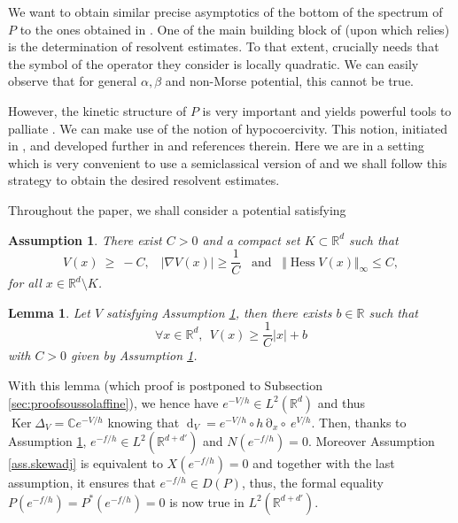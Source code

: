 \documentclass[12pt]{amsart}
\newcommand{\C}{\mathbb C}
\newcommand{\R}{\mathbb R}
\newcommand{\Hess}{\operatorname{Hess}}
\newcommand{\Ker}{\operatorname{Ker}}
\renewcommand{\d}{\operatorname{d}}
\numberwithin{equation}{section}
\numberwithin{figure}{section}
\DeclareMathOperator{\p}{\partial}
\newtheorem{lemma}[defin]{Lemma}
\newtheorem{assumption}{Assumption}
\begin{document}
We want to obtain similar precise asymptotics of the bottom of the spectrum of $P$ to the ones obtained in \cite{HeHiSj11_01,BoLePMi22}. One of the main building block of \cite{HeHiSj08-2} (upon which \cite{HeHiSj11_01,BoLePMi22} relies) is the determination of resolvent estimates. To that extent, \cite{HeHiSj08-2} crucially needs that the symbol of the operator they consider is locally quadratic. We can easily observe that for general $\alpha,\beta$ and non-Morse potential, this cannot be true.

However, the kinetic structure of $P$ is very important and yields powerful tools to palliate \cite{HeHiSj08-2}. We can make use of the notion of hypocoercivity. This notion, initiated in \cite{He06}, and developed further in \cite{Vi09,CaDoHeMiMoSc24} and references therein. Here we are in a setting which is very convenient to use a semiclassical version of \cite{DoMoSc15} and we shall follow this strategy to obtain the desired resolvent estimates.

Throughout the paper, we shall consider a potential satisfying

\begin{assumption}\label{ass.confin}
There exist $C>0$ and a compact  set $K\subset\R^d$ such that
\begin{equation*}
V(x)\ \geq\  -C,\;\;\;
 \vert\nabla V(x)\vert \geq \frac 1 C\;\;\;\text{and}\;\;\; \Vert\Hess V(x)\Vert_\infty \leq C,
\end{equation*}
for all $x\in\R^d\setminus K$.
\end{assumption}

\begin{lemma}\label{lem:soussolaffine}
    Let $V$ satisfying Assumption \ref{ass.confin}, then there exists $b\in\R$ such that
    \begin{equation*}
    \forall x\in\R^d,\ \ V(x) \geq \frac1C|x| + b
    \end{equation*}
    with $C>0$ given by Assumption \ref{ass.confin}. 
\end{lemma}
With this lemma (which proof is postponed to Subsection \ref{sec:proofsoussolaffine}), we hence have $e^{-V/h}\in L^2(\R^d)$ and thus $\Ker\Delta_V = \C e^{-V/h}$ knowing that $\d_V = e^{-V/h}\circ h\p_x\circ\ e^{V/h}$. Then, thanks to Assumption \ref{ass.confin}, $e^{-f/h}\in L^2(\R^{d+d'})$ and $N(e^{-f/h}) = 0$. Moreover Assumption \ref{ass.skewadj} is equivalent to $X(e^{-f/h}) = 0$ and together with the last assumption, it ensures that $e^{-f/h}\in D(P)$, thus, the formal equality $P(e^{-f/h}) = P^*(e^{-f/h}) = 0$ is now true in $L^2(\R^{d+d'})$.
\end{document}
